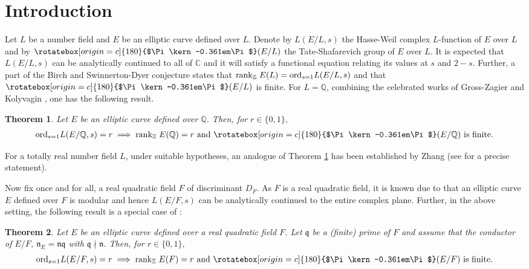 \documentclass[reqno,10pt]{amsart}
\newcommand{\q}{\mathbb{Q}}
\newcommand{\z}{\mathbb{Z}}
\newcommand{\n}{\mathfrak{n}}
\newcommand{\Varpi}{\rotatebox[origin=c]{180}{$\Pi\kern-0.361em\Pi$}}
\theoremstyle{plain}
\newtheorem{thm}{Theorem}[section]
\theoremstyle{definition}
\begin{document}
\maketitle
\tableofcontents

\section{Introduction}

Let $L$ be a number field and $E$ be an elliptic curve defined over $L$. Denote by $L(E/L,s)$ the Hasse-Weil complex $L$-function of $E$ over $L$ and by $\Varpi(E/L)$ the Tate-Shafarevich group of $E$ over $L$. It is expected that $L(E/L,s)$ can be analytically continued to all of $\mathbb C$  and it will satisfy a functional equation relating its values at $s$ and $2-s$. Further, a part of the Birch and Swinnerton-Dyer conjecture states that $\mathrm{rank}_\z \hspace{0.01mm} \hspace{1mm} E(L) = \mathrm{ord}_{s=1} L(E/L,s)$ and that $\Varpi(E/L)$ is finite. For $L=\q$, combining the celebrated works of Gross-Zagier   \cite{GrossZagier} and Kolyvagin \cite{Kolyvagin}, one has the following result.   
\begin{thm}\label{GZK}
   Let $E$ be an elliptic curve defined over $\q$. Then, for $r\in \{0,1\},$ 
   \begin{align*} \mathrm{ord}_{s=1} L(E/\q,s) =r \implies \mathrm{rank}_\z \hspace{0.01mm} \hspace{1mm} E(\q) = r \text{ and } \Varpi(E/\q) \text{ is finite.}\end{align*}
\end{thm}

For a totally real number field $L$, under suitable hypotheses, an analogue of Theorem \ref{GZK} has been established by  Zhang \cite{Zhang} (see \cite[Theorem A]{Zhang} for a precise statement).


Now fix once and for all, a real quadratic field $F$ of discriminant $D_F$. As $F$ is a real quadratic field, it is known due to \cite{FLHS} that an elliptic curve $E$ defined over $F$ is modular and hence $L(E/F,s)$ can be analytically continued to the entire complex plane. Further, in the above setting, the following result is a special case of \cite[Theorem A]{Zhang}:   


\begin{thm}\label{ZhangMainResult}
  Let $E$ be an elliptic curve defined over a real quadratic field $F$. Let $\mathfrak q$ be a (finite) prime of $F$ and  assume that the conductor of $E/F$, $\n_E = \n\mathfrak q$ with $\mathfrak q \nmid \n$. Then, for $r\in \{0,1\},$ 
   \begin{align*} \mathrm{ord}_{s=1} L(E/F,s) =r \implies \mathrm{rank}_\z \hspace{0.01mm} \hspace{1mm} E(F) = r \text{ and } \Varpi(E/F) \text{ is finite.}\end{align*}
\end{thm}
\end{document}
